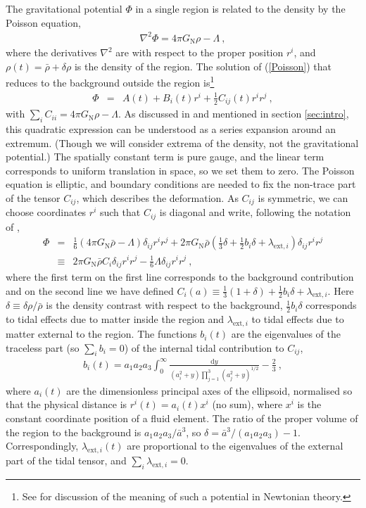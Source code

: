 \documentclass[11pt, a4paper]{article}
\newcommand{\bea}{\begin{eqnarray}} \newcommand{\eea}{\end{eqnarray}}
\newcommand{\el}{\nonumber \\}
\newcommand{\re}[1]{(\ref{#1})}
\renewcommand{\sec}[1]{section \ref{#1}}
\renewcommand{\d}{\delta}
\renewcommand{\l}{\lambda}
\newcommand{\GN}{G_{\mathrm{N}}}
\newcommand{\ha}{\frac{1}{2}}
\newcommand{\rmd}{\mathrm{d}}
\newcommand{\half}{\frac{1}{2}}
\newcommand{\rhob}{\bar{\rho}}
\newcommand{\lei}{\l_{\mathrm{ext},i}}
\begin{document}
The gravitational potential $\Phi$ in a single region is related to the density by the Poisson equation,
\bea \label{Poisson}
  \nabla^2 \Phi = 4\pi\GN \rho - \Lambda \ ,
\eea
%
where the derivatives $\nabla^2$ are with respect to the proper position $r^i$, and $\rho(t)=\rhob+\d\rho$ is the density of the region. The solution of \re{Poisson} that reduces to the background outside the region is\footnote{See \cite{Malament:1995, *Norton:1995} for discussion of the meaning of such a potential in Newtonian theory.}
\bea
  \Phi &=& A(t) + B_i(t) r^i + \ha C_{ij}(t) r^i r^j \ ,
\eea
%
with $\sum_i C_{ii}=4\pi\GN \rho - \Lambda$. As discussed in \cite{Bond:1996} and mentioned in \sec{sec:intro}, this quadratic expression can be understood as a series expansion around an extremum. (Though we will consider extrema of the density, not the gravitational potential.) The spatially constant term is pure gauge, and the linear term corresponds to uniform translation in space, so we set them to zero. The Poisson equation is elliptic, and boundary conditions are needed to fix the non-trace part of the tensor $C_{ij}$, which describes the deformation. As $C_{ij}$ is symmetric, we can choose coordinates $r^i$ such that $C_{ij}$ is diagonal and write, following the notation of \cite{Angrick:2010qg},
\bea \label{phi}
  \Phi &=& \frac{1}{6} ( 4\pi\GN \rhob - \Lambda ) \d_{ij} r^i r^j + 2\pi\GN \rhob \left( \frac{1}{3} \d + \half b_i \d + \lei \right) \d_{ij} r^i r^j \el
  &\equiv& 2\pi\GN \rhob C_i \d_{ij} r^i r^j - \frac{1}{6} \Lambda \d_{ij} r^i r^j \ ,
\eea
%
where the first term on the first line corresponds to the background contribution and on the second line we have defined $C_i(a)\equiv\frac{1}{3} (1+\d) + \half b_i \d + \lei$. Here $\d\equiv\d\rho/\rhob$ is the density contrast with respect to the background, $\ha b_i\d$ corresponds to tidal effects due to matter inside the region and $\lei$ to tidal effects due to matter external to the region. The functions $b_i(t)$ are the eigenvalues of the traceless part (so $\sum_i b_i=0$) of the internal tidal contribution to $C_{ij}$,
\bea
  b_i(t) = a_1 a_2 a_3 \int_0^\infty \frac{\rmd y}{ (a_i^2+y) \prod_{j=1}^3 (a_j^2+y)^{1/2} } - \frac{2}{3} \ ,
\eea
%
where $a_i(t)$ are the dimensionless principal axes of the ellipsoid, normalised so that the physical distance is $r^i(t)=a_i(t) x^i$ (no sum), where $x^i$ is the constant coordinate position of a fluid element. The ratio of the proper volume of the region to the background is $a_1 a_2 a_3/\bar{a}^3$, so $\delta=\bar{a}^3/(a_1 a_2 a_3)-1$.  Correspondingly, $\lei(t)$ are proportional to the eigenvalues of the external part of the tidal tensor, and $\sum_i \lei=0$.
\end{document}
